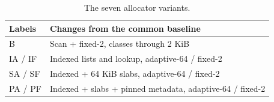 \begin{table}[t]
\caption{The seven allocator variants.}\label{tab:variants}
\centering\small
\begin{tabular}{@{}lp{}@{}}\toprule
Labels & Changes from the common baseline \\ \midrule
B & Scan + fixed-2, classes through 2 KiB \\
IA / IF & Indexed lists and lookup, adaptive-64 / fixed-2 \\
SA / SF & Indexed + 64 KiB slabs, adaptive-64 / fixed-2 \\
PA / PF & Indexed + slabs + pinned metadata, adaptive-64 / fixed-2 \\
\bottomrule\end{tabular}
\end{table}
